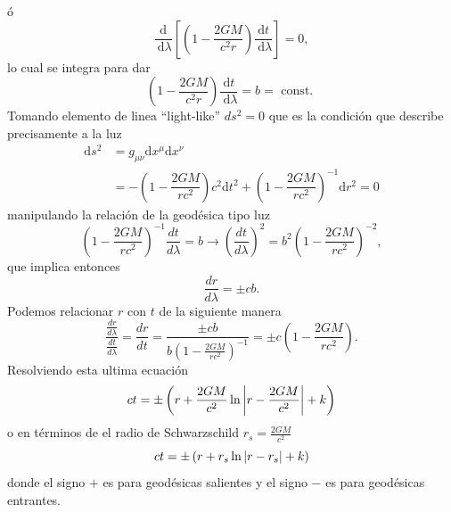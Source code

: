 ó
\begin{equation}
    \frac{\mathrm{d}}{\mathrm{~d} \lambda}\left[\left(1-\dfrac{2 G M}{c^2 r}\right) \frac{\mathrm{d} t}{\mathrm{~d} \lambda}\right]=0,
\end{equation}
lo cual se integra para dar
\begin{equation}
    \left(1-\dfrac{2 G M}{c^2 r}\right) \frac{\mathrm{d} t}{\mathrm{~d} \lambda}=b=\text { const. }
\end{equation}
Tomando elemento de linea ``light-like'' $ds^2 = 0$ que es la condición que describe precisamente a la luz 
\begin{equation}
    \begin{aligned}
        \mathrm{d} s^2 & =g_{\mu \nu} \mathrm{d} x^\mu \mathrm{d} x^\nu                                                                      \\
                       & =-\left(1-\dfrac{2 G M}{r c^2}\right)c^2 \mathrm{d} t^2+\left(1-\dfrac{2 G M}{r c^2}\right)^{-1} \mathrm{d} r^2 = 0
    \end{aligned}
\end{equation}
manipulando la relación de la geodésica tipo luz
\begin{equation}
    \left(1-\frac{2 G M}{r c^2}\right)^{-1} \frac{dt}{d\lambda}  = b \rightarrow  \left(\frac{dt}{d\lambda}\right)^2 = b^2 \left(1-\frac{2 G M}{r c^2}\right)^{-2},
\end{equation}
que implica  entonces
\begin{equation}
    \frac{d r }{d \lambda}= \pm cb.
\end{equation}
Podemos relacionar $r$ con $t$  de la siguiente manera
\begin{equation}
    \frac{\frac{dr}{d\lambda}}{\frac{dt}{d\lambda}} =   \frac{dr}{dt} =  \frac{\pm cb }{ b \left(1-\frac{2 G M}{r c^2}\right)^{-1}} = \pm c \left(1-\frac{2 G M}{r c^2}\right).
\end{equation}
Resolviendo esta ultima ecuación
\begin{equation}
    ct = \pm \left(r + \frac{2 G M}{c^2} \ln \left| r -\frac{2 G M}{c^2}  \right| + k \right)
\end{equation}
o en términos de el radio de Schwarzschild $r_s = \frac{2 G M}{c^2}$
\begin{equation}
    ct = \pm \left(r + r_s \ln\left| r - r_s \right| + k \right)
    \label{eq:lightRaysSchwarzschild}
\end{equation}
donde el signo $+$ es para geodésicas salientes y el signo $-$ es para geodésicas entrantes.
